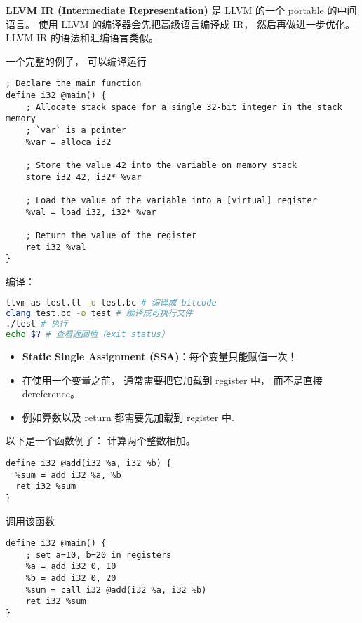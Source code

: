 
\begin{issues}
\issueDraft
\end{issues}


\textbf{LLVM IR (Intermediate Representation)} 是 LLVM 的一个 portable 的中间语言。 使用 LLVM 的编译器会先把高级语言编译成 IR， 然后再做进一步优化。 LLVM IR 的语法和汇编语言类似。

一个完整的例子， 可以编译运行
\begin{lstlisting}[language=none,caption=test.ll]
; Declare the main function
define i32 @main() {
    ; Allocate stack space for a single 32-bit integer in the stack memory
    ; `var` is a pointer
    %var = alloca i32

    ; Store the value 42 into the variable on memory stack
    store i32 42, i32* %var

    ; Load the value of the variable into a [virtual] register
    %val = load i32, i32* %var

    ; Return the value of the register
    ret i32 %val
}
\end{lstlisting}

编译：
\begin{lstlisting}[language=bash]
llvm-as test.ll -o test.bc # 编译成 bitcode
clang test.bc -o test # 编译成可执行文件
./test # 执行
echo $? # 查看返回值（exit status）
\end{lstlisting}

\begin{itemize}
\item \textbf{Static Single Assignment (SSA)}：每个变量只能赋值一次！
\item  在使用一个变量之前， 通常需要把它加载到 register 中， 而不是直接 dereference。
\item 例如算数以及 return 都需要先加载到 register 中.
\end{itemize}

以下是一个函数例子： 计算两个整数相加。
\begin{lstlisting}[language=none]
define i32 @add(i32 %a, i32 %b) {
  %sum = add i32 %a, %b
  ret i32 %sum
}
\end{lstlisting}

调用该函数
\begin{lstlisting}[language=none]
define i32 @main() {
    ; set a=10, b=20 in registers
    %a = add i32 0, 10
    %b = add i32 0, 20
    %sum = call i32 @add(i32 %a, i32 %b)
    ret i32 %sum
}
\end{lstlisting}

